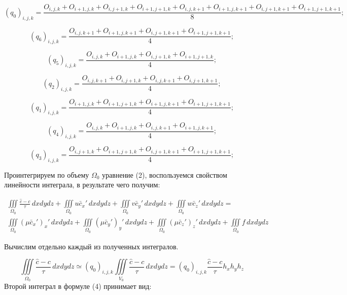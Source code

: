 \documentclass[12pt]{article}
\begin{document}
\begin{equation*}
(q_0)_{i,j,k}=\frac{O_{i,j,k}+O_{i+1,j,k}+O_{i,j+1,k}+O_{i+1,j+1,k}+O_{i,j,k+1}+O_{i+1,j,k+1}+O_{i,j+1,k+1}+O_{i+1,j+1,k+1}}{8};
\end{equation*}

\begin{equation*}
(q_6)_{i,j,k}=\frac{O_{i,j,k+1}+O_{i+1,j,k+1}+O_{i,j+1,k+1}+O_{i+1,j+1,k+1}}{4};
\end{equation*}

\begin{equation*}
(q_5)_{i,j,k}=\frac{O_{i,j,k}+O_{i+1,j,k}+O_{i,j+1,k}+O_{i+1,j+1,k}}{4};
\end{equation*}

\begin{equation*}
(q_2)_{i,j,k}=\frac{O_{i,j,k+1}+O_{i,j+1,k}+O_{i,j,k+1}+O_{i,j+1,k+1}}{4};
\end{equation*}

\begin{equation*}
(q_1)_{i,j,k}=\frac{O_{i+1,j,k}+O_{i+1,j+1,k}+O_{i+1,j,k+1}+O_{i+1,j+1,k+1}}{4};
\end{equation*}

\begin{equation*}
(q_4)_{i,j,k}=\frac{O_{i,j,k}+O_{i+1,j,k}+O_{i,j,k+1}+O_{i+1,j,k+1}}{4};
\end{equation*}

\begin{equation*}
(q_3)_{i,j,k}=\frac{O_{i,j+1,k}+O_{i+1,j+1,k}+O_{i,j+1,k+1}+O_{i+1,j+1,k+1}}{4};
\end{equation*}

Проинтегрируем по объему $\Omega_0$ уравнение (2), воспользуемся свойством линейности интеграла, в результате чего получим:

\begin{multline}
\iiint\limits_{\Omega_0} \frac{\hat c - c}{\tau}\,dxdydz + \iiint\limits_{\Omega_0} u\bar{c}_x'\,dxdydz + \iiint\limits_{\Omega_0} v\bar{c}_y'\,dxdydz + \iiint\limits_{\Omega_0} w\bar{c}_z'\,dxdydz = \\
\iiint\limits_{\Omega_0} (\mu\bar{c}_x')_x'\,dxdydz + \iiint\limits_{\Omega_0} (\mu\bar{c}_y')_y'\,dxdydz + \iiint\limits_{\Omega_0} (\mu\bar{c}_z')_z'\,dxdydz + \iiint\limits_{\Omega_0} f\,dxdydz  
\end{multline}

Вычислим отдельно каждый из полученных интегралов.

\begin{equation}
	\iiint\limits_{\Omega_0} \frac{\hat c - c}{\tau}\,dxdydz \simeq (q_0)_{i,j,k}\iiint\limits_{V_0} \frac{\hat c - c}{\tau}\,dxdydz = (q_0)_{i,j,k}\frac{\hat c - c}{\tau}h_xh_yh_z
\end{equation}
Второй интеграл в формуле (4) принимает вид:
\end{document}
